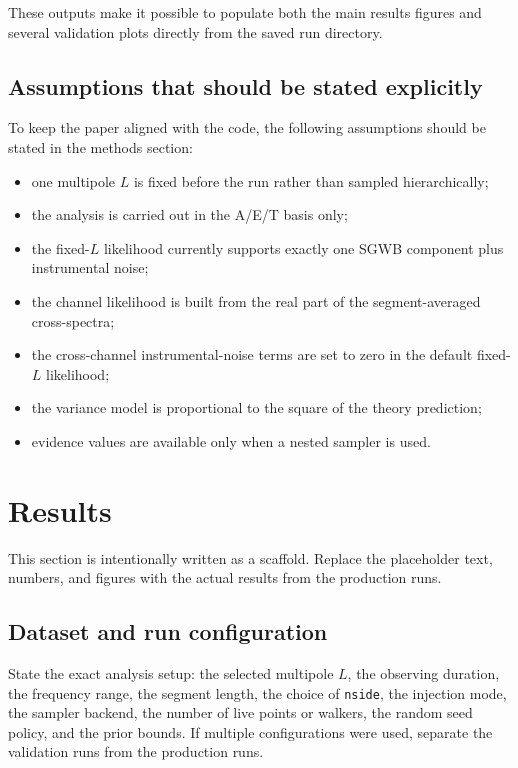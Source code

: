 \documentclass[11pt]{article}
\begin{document}
These outputs make it possible to populate both the main results figures and several validation plots directly from the saved run directory.

\subsection{Assumptions that should be stated explicitly}

To keep the paper aligned with the code, the following assumptions should be stated in the methods section:
\begin{itemize}[leftmargin=2.2em]
  \item one multipole $L$ is fixed before the run rather than sampled hierarchically;
  \item the analysis is carried out in the A/E/T basis only;
  \item the fixed-$L$ likelihood currently supports exactly one SGWB component plus instrumental noise;
  \item the channel likelihood is built from the real part of the segment-averaged cross-spectra;
  \item the cross-channel instrumental-noise terms are set to zero in the default fixed-$L$ likelihood;
  \item the variance model is proportional to the square of the theory prediction;
  \item evidence values are available only when a nested sampler is used.
\end{itemize}

\section{Results}

This section is intentionally written as a scaffold. Replace the placeholder text, numbers, and figures with the actual results from the production runs.

\subsection{Dataset and run configuration}

State the exact analysis setup: the selected multipole $L$, the observing duration, the frequency range, the segment length, the choice of \texttt{nside}, the injection mode, the sampler backend, the number of live points or walkers, the random seed policy, and the prior bounds. If multiple configurations were used, separate the validation runs from the production runs.
\end{document}
